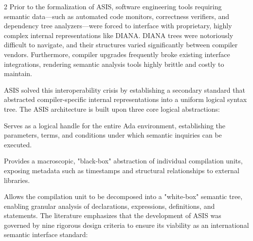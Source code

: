 \documentclass[11pt,letterpaper]{article}
\newcommand{\headingfont}{\sffamily}
\newcommand{\miniheading}[1]{%
  \par\noindent{\headingfont\bfseries\fontsize{12pt}{14pt}\selectfont #1}\par\vspace{4pt}%
}
\begin{document}
\begin{multicols*}{2}
Prior to the formalization of ASIS, software engineering tools requiring semantic data—such as automated code monitors, correctness verifiers, and dependency tree analyzers—were forced to interface with proprietary, highly complex internal representations like DIANA. DIANA trees were notoriously difficult to navigate, and their structures varied significantly between compiler vendors. Furthermore, compiler upgrades frequently broke existing interface integrations, rendering semantic analysis tools highly brittle and costly to maintain.

ASIS solved this interoperability crisis by establishing a secondary standard that abstracted compiler-specific internal representations into a uniform logical syntax tree. The ASIS architecture is built upon three core logical abstractions:

\miniheading{Context}
Serves as a logical handle for the entire Ada environment, establishing the parameters, terms, and conditions under which semantic inquiries can be executed.
\miniheading{Compilation\_Unit}
Provides a macroscopic, "black-box" abstraction of individual compilation units, exposing metadata such as timestamps and structural relationships to external libraries.
\miniheading{Element}
Allows the compilation unit to be decomposed into a "white-box" semantic tree, enabling granular analysis of declarations, expressions, definitions, and statements.
The literature emphasizes that the development of ASIS was governed by nine rigorous design criteria to ensure its viability as an international semantic interface standard:


\end{multicols*}
\end{document}
